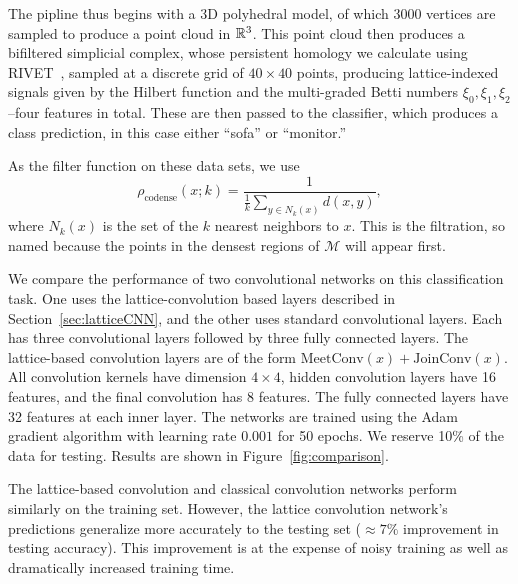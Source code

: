 \documentclass{article}
\begin{document}
The pipline thus begins with a 3D polyhedral model, of which $3000$ vertices are sampled to produce a point
cloud in $\mathbb{R}^3$. This point cloud then produces a bifiltered simplicial complex,
whose persistent homology we calculate using
RIVET~\cite{lesnick_interactive_2015}, sampled at a discrete grid of $40 \times
40$ points, producing lattice-indexed signals given by the Hilbert function and
the multi-graded Betti numbers $\xi_0, \xi_1, \xi_2$--four features in total. These are then passed to the classifier, which
produces a class prediction, in this case either ``sofa'' or ``monitor.''

As the filter function on these data sets, we use
\[\rho_{\text{codense}}(x;k) = \frac{1}{\frac{1}{k} \sum_{y \in N_k(x)}
    d(x,y)},\]
where $N_k(x)$ is the set of the $k$ nearest neighbors to $x$. This is the
 filtration, so named because the points in the densest
regions of $\mathcal M$ will appear first.


We compare the performance of two convolutional networks on this classification
task. One uses the lattice-convolution based layers described in
Section~\ref{sec:latticeCNN}, and the other uses standard convolutional layers.
Each has three convolutional layers followed by three fully connected layers.
The lattice-based convolution layers are of the form $\text{MeetConv}(x) +
\text{JoinConv}(x)$. All convolution kernels have dimension $4 \times 4$, hidden
convolution layers have 16 features, and the final convolution has 8 features.
The fully connected layers have 32 features at each inner layer.
The networks are trained using the Adam gradient algorithm with learning rate
$0.001$ for 50 epochs. We reserve 10\% of the data for testing. Results are
shown in Figure~\ref{fig:comparison}.

The lattice-based convolution and classical convolution networks perform
similarly on the training set. However, the lattice convolution network's
predictions generalize more accurately to the testing set ($\approx 7\%$ improvement in testing accuracy).
This improvement is  at the expense of noisy training as well as dramatically increased training time.  
\end{document}
